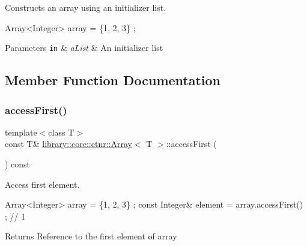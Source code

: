 Constructs an array using an initializer list. 


\begin{DoxyCode}
Array<Integer> array = \{1, 2, 3\} ;
\end{DoxyCode}



\begin{DoxyParams}[1]{Parameters}
\mbox{\tt in}  & {\em a\+List} & An initializer list \\
\hline
\end{DoxyParams}


\subsection{Member Function Documentation}
\mbox{\label{classlibrary_1_1core_1_1ctnr_1_1Array_afea012716d6cfffa2803606c0b244419}} 
\subsubsection{\texorpdfstring{access\+First()}{accessFirst()}\hspace{0.1cm}{\footnotesize\ttfamily [1/2]}}
{\footnotesize\ttfamily template$<$class T$>$ \\
const T\& \hyperlink{classlibrary_1_1core_1_1ctnr_1_1Array}{library\+::core\+::ctnr\+::\+Array}$<$ T $>$\+::access\+First (\begin{DoxyParamCaption}{ }\end{DoxyParamCaption}) const}



Access first element. 


\begin{DoxyCode}
Array<Integer> array = \{1, 2, 3\} ;
\textcolor{keyword}{const} Integer& element = array.accessFirst() ; \textcolor{comment}{// 1}
\end{DoxyCode}


\begin{DoxyReturn}{Returns}
Reference to the first element of array 
\end{DoxyReturn}
\mbox{\label{classlibrary_1_1core_1_1ctnr_1_1Array_abb2068e46720e8df057b5410ac8879d5}} 
